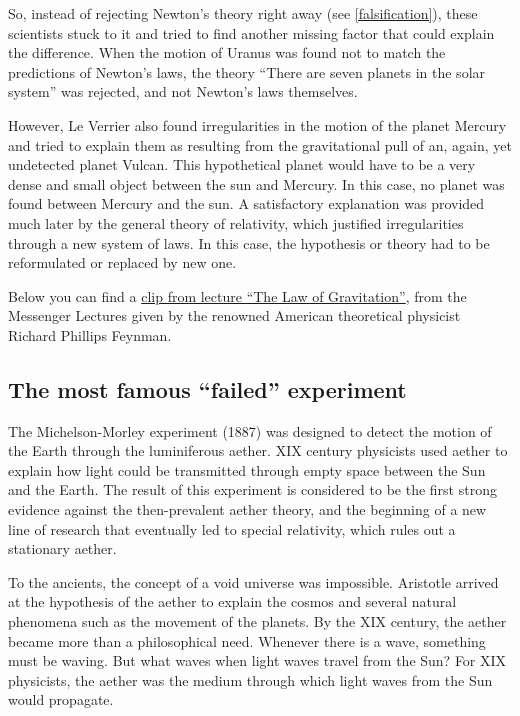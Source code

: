 \documentclass[
]{book}
\begin{document}
So, instead of rejecting Newton's theory right away (see \ref{falsification}), these scientists stuck to it and tried to find another missing factor that could explain the difference. When the motion of Uranus was found not to match the predictions of Newton's laws, the theory ``There are seven planets in the solar system'' was rejected, and not Newton's laws themselves.

However, Le Verrier also found irregularities in the motion of the planet Mercury and tried to explain them as resulting from the gravitational pull of an, again, yet undetected planet Vulcan. This hypothetical planet would have to be a very dense and small object between the sun and Mercury. In this case, no planet was found between Mercury and the sun. A satisfactory explanation was provided much later by the general theory of relativity, which justified irregularities through a new system of laws. In this case, the hypothesis or theory had to be reformulated or replaced by new one.

Below you can find a \href{https://www.youtube.com/watch?v=j3mhkYbznBk\&t=1830s}{clip from lecture ``The Law of Gravitation''}, from the Messenger Lectures given by the renowned American theoretical physicist Richard Phillips Feynman.

\hypertarget{michelson-morley}{%
\subsection{The most famous ``failed'' experiment}\label{michelson-morley}}

The Michelson-Morley experiment (1887) was designed to detect the motion of the Earth through the luminiferous aether. XIX century physicists used aether to explain how light could be transmitted through empty space between the Sun and the Earth. The result of this experiment is considered to be the first strong evidence against the then-prevalent aether theory, and the beginning of a new line of research that eventually led to special relativity, which rules out a stationary aether.

To the ancients, the concept of a void universe was impossible. Aristotle arrived at the hypothesis of the aether to explain the cosmos and several natural phenomena such as the movement of the planets. By the XIX century, the aether became more than a philosophical need. Whenever there is a wave, something must be waving. But what waves when light waves travel from the Sun? For XIX physicists, the aether was the medium through which light waves from the Sun would propagate.
\end{document}
